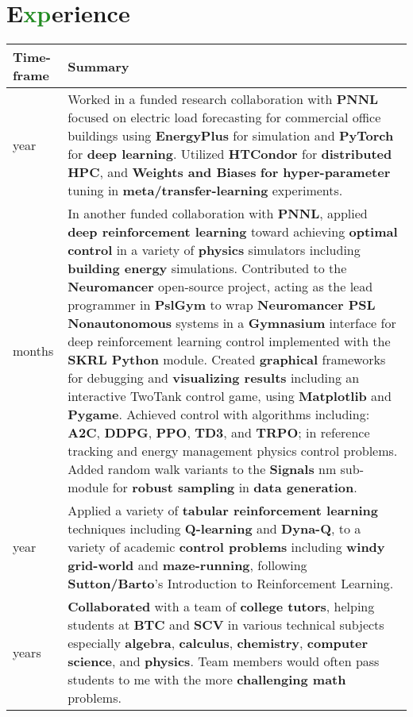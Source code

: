 \documentclass[letterpaper]{twentysecondcv} %
\begin{document}
\section{E\textcolor{ForestGreen}{xp}erience}
\setlength{\tabcolsep}{8pt}  %
\renewcommand{\arraystretch}{1.5} %
\begin{tabular}{|>{\centering\arraybackslash}m{}|>{\RaggedRight\arraybackslash}m{}|}
\hline
Time-frame & Summary\\\hline
1 year & Worked in a funded research collaboration with \textbf{PNNL} focused on electric load forecasting for commercial office buildings using \textbf{EnergyPlus} for simulation and \textbf{PyTorch} for \textbf{deep learning}. Utilized \textbf{HTCondor} for \textbf{distributed} \textbf{HPC}, and \textbf{Weights and Biases} \textbf{for hyper-parameter} tuning in \textbf{meta/transfer-learning} experiments.\\\hline
9 months & In another funded collaboration with \textbf{PNNL}, applied \textbf{deep reinforcement learning} toward achieving \textbf{optimal control} in a variety of \textbf{physics} simulators including \textbf{building energy} simulations. Contributed to the \textbf{Neuromancer} open-source project, acting as the lead programmer in \textbf{PslGym} to wrap \textbf{Neuromancer PSL Nonautonomous} systems in a \textbf{Gymnasium} interface for deep reinforcement learning control implemented with the \textbf{SKRL Python} module. Created \textbf{graphical} frameworks for debugging and \textbf{visualizing results} including an interactive TwoTank control game, using \textbf{Matplotlib} and \textbf{Pygame}. Achieved control with algorithms including: \textbf{A2C}, \textbf{DDPG}, \textbf{PPO}, \textbf{TD3}, and \textbf{TRPO}; in reference tracking and energy management physics control problems. Added random walk variants to the \textbf{Signals} nm sub-module for \textbf{robust sampling} in \textbf{data generation}.\\\hline
1 year & Applied a variety of \textbf{tabular reinforcement learning} techniques including \textbf{Q-learning} and \textbf{Dyna-Q}, to a variety of academic \textbf{control problems} including \textbf{windy grid-world} and \textbf{maze-running}, following \textbf{Sutton/Barto}'s Introduction to Reinforcement Learning.\\\hline
2 years & \textbf{Collaborated} with a team of \textbf{college tutors}, helping students at \textbf{BTC} and \textbf{SCV} in various technical subjects especially \textbf{algebra}, \textbf{calculus}, \textbf{chemistry}, \textbf{computer science}, and \textbf{physics}. Team members would often pass students to me with the more \textbf{challenging math} problems.\\\hline
\end{tabular}
\end{document}
